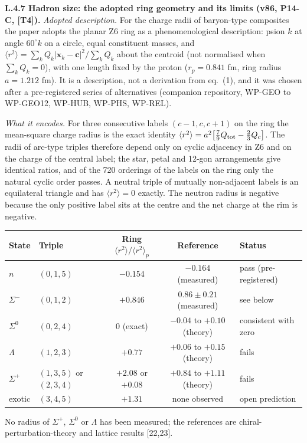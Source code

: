 \noindent \textbf{L.4.7 Hadron size: the adopted ring geometry and its limits (v86, P14-C, [T4]).} \emph{Adopted description.} For the charge radii of baryon-type composites the paper adopts the planar Z6 ring as a phenomenological description: psion $k$ at angle $60^\circ k$ on a circle, equal constituent masses, and $\langle r^2\rangle=\sum_kQ_k|\mathbf{x}_k-\mathbf{c}|^2/\sum_kQ_k$ about the centroid (not normalised when $\sum_kQ_k=0$), with one length fixed by the proton ($r_p=0.841$ fm, ring radius $a=1.212$ fm). It is a description, not a derivation from eq.~(1), and it was chosen after a pre-registered series of alternatives (companion repository, WP-GEO to WP-GEO12, WP-HUB, WP-PHS, WP-REL).

\noindent \emph{What it encodes.} For three consecutive labels $(c-1,c,c+1)$ on the ring the mean-square charge radius is the exact identity $\langle r^2\rangle=a^2\big[\tfrac79Q_{\rm tot}-\tfrac23Q_c\big]$. The radii of arc-type triples therefore depend only on cyclic adjacency in Z6 and on the charge of the central label; the star, petal and 12-gon arrangements give identical ratios, and of the 720 orderings of the labels on the ring only the natural cyclic order passes. A neutral triple of mutually non-adjacent labels is an equilateral triangle and has $\langle r^2\rangle=0$ exactly. The neutron radius is negative because the only positive label sits at the centre and the net charge at the rim is negative.

\begin{center}\small
\begin{tabular}{llccl}
State & Triple & Ring $\langle r^2\rangle/\langle r^2\rangle_p$ & Reference & Status \\ \hline
$n$ & $(0,1,5)$ & $-0.154$ & $-0.164$ (measured) & pass (pre-registered) \\
$\Sigma^-$ & $(0,1,2)$ & $+0.846$ & $0.86\pm0.21$ (measured) & see below \\
$\Sigma^0$ & $(0,2,4)$ & $0$ (exact) & $-0.04$ to $+0.10$ (theory) & consistent with zero \\
$\Lambda$ & $(1,2,3)$ & $+0.77$ & $+0.06$ to $+0.15$ (theory) & fails \\
$\Sigma^+$ & $(1,3,5)$ or $(2,3,4)$ & $+2.08$ or $+0.08$ & $+0.84$ to $+1.11$ (theory) & fails \\
exotic & $(3,4,5)$ & $+1.31$ & none observed & open prediction \\
\end{tabular}
\end{center}
\noindent No radius of $\Sigma^+$, $\Sigma^0$ or $\Lambda$ has been measured; the references are chiral-perturbation-theory and lattice results [22,23].

